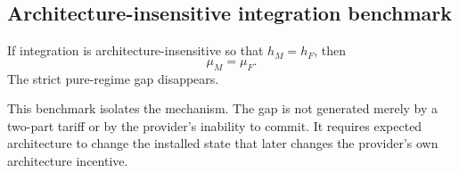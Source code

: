 \begin{table}[ht]
  \centering
  
  \caption{Generated exact objects for the permanent strict-$\mathcal R^+$ example. The table is produced by the repository generator and serves as a numerical illustration rather than a substitute for the theorem quantifiers.}
  \label{tab:baseline-example}
\end{table}

\subsection{Architecture-insensitive integration benchmark}

\begin{corollary}\label{cor:collapse}
If integration is architecture-insensitive so that $h_M=h_F$, then
\begin{equation}
 \mu_M=\mu_F.
\end{equation}
The strict pure-regime gap disappears.
\end{corollary}

This benchmark isolates the mechanism. The gap is not generated merely by a two-part tariff or by the provider's inability to commit. It requires expected architecture to change the installed state that later changes the provider's own architecture incentive.
